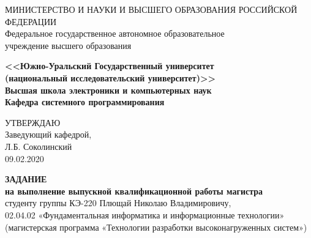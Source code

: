 \begin{titlepage}
    
    \begin{center}
        МИНИСТЕРСТВО И НАУКИ И ВЫСШЕГО ОБРАЗОВАНИЯ РОССИЙСКОЙ ФЕДЕРАЦИИ\\
        Федеральное государственное автономное образовательное\\
        учреждение высшего образования

        \textbf{
        <<Южно-Уральский Государственный университет\\
        (национальный исследовательский университет)>>\\
        Высшая школа электроники и компьютерных наук\\
        Кафедра системного программирования
        }
        \bigskip
    \end{center}

    \hfill
    \begin{minipage}{0.4\textwidth}
        УТВЕРЖДАЮ\\
        Заведующий кафедрой,\\
        \underline{\hspace{2cm}} Л.Б. Соколинский\\
        09.02.2020
    \end{minipage}

    \begin{center}
        \textbf{ЗАДАНИЕ}\\
        \textbf{на выполнение выпускной квалификационной работы магистра}\\
        студенту группы КЭ-220 Плющай Николаю Владимировичу,\\
        02.04.02 «Фундаментальная информатика и информационные технологии»\\
        (магистерская программа «Технологии разработки высоконагруженных систем»)\\
    \end{center}


\end{titlepage}
